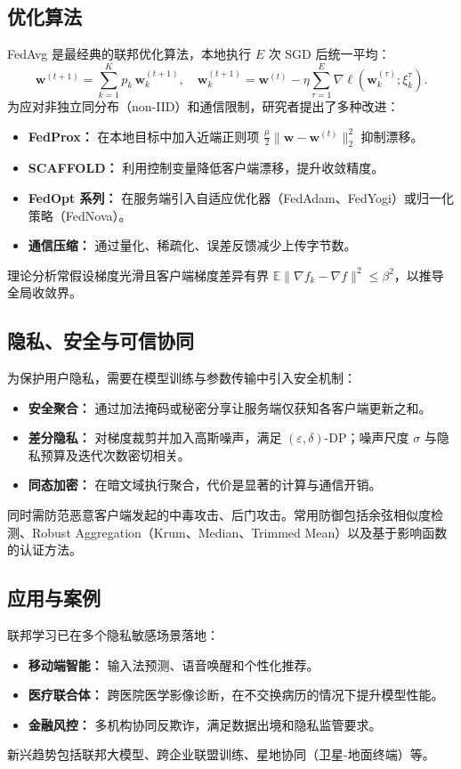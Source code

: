 \documentclass[UTF8,zihao=-4]{ctexart}
\begin{document}
\subsection{优化算法}
FedAvg 是最经典的联邦优化算法，本地执行 $E$ 次 SGD 后统一平均：
\begin{equation}
  \mathbf{w}^{(t+1)} = \sum_{k=1}^{K} p_k \, \mathbf{w}_k^{(t+1)}, \quad \mathbf{w}_k^{(t+1)} = \mathbf{w}^{(t)} - \eta \sum_{\tau=1}^{E} \nabla \ell(\mathbf{w}_k^{(\tau)}; \xi_k^\tau).
\end{equation}
为应对非独立同分布（non-IID）和通信限制，研究者提出了多种改进：
\begin{itemize}
  \item \textbf{FedProx：} 在本地目标中加入近端正则项 $\frac{\mu}{2}\|\mathbf{w}-\mathbf{w}^{(t)}\|_2^2$ 抑制漂移。
  \item \textbf{SCAFFOLD：} 利用控制变量降低客户端漂移，提升收敛精度。
  \item \textbf{FedOpt 系列：} 在服务端引入自适应优化器（FedAdam、FedYogi）或归一化策略（FedNova）。
  \item \textbf{通信压缩：} 通过量化、稀疏化、误差反馈减少上传字节数。
\end{itemize}
理论分析常假设梯度光滑且客户端梯度差异有界 $\mathbb{E}\|\nabla f_k - \nabla f\|^2 \le \beta^2$，以推导全局收敛界。

\subsection{隐私、安全与可信协同}
为保护用户隐私，需要在模型训练与参数传输中引入安全机制：
\begin{itemize}
  \item \textbf{安全聚合：} 通过加法掩码或秘密分享让服务端仅获知各客户端更新之和。
  \item \textbf{差分隐私：} 对梯度裁剪并加入高斯噪声，满足 $(\varepsilon,\delta)$-DP；噪声尺度 $\sigma$ 与隐私预算及迭代次数密切相关。
  \item \textbf{同态加密：} 在暗文域执行聚合，代价是显著的计算与通信开销。
\end{itemize}
同时需防范恶意客户端发起的中毒攻击、后门攻击。常用防御包括余弦相似度检测、Robust Aggregation（Krum、Median、Trimmed Mean）以及基于影响函数的认证方法。

\subsection{应用与案例}
联邦学习已在多个隐私敏感场景落地：
\begin{itemize}
  \item \textbf{移动端智能：} 输入法预测、语音唤醒和个性化推荐。
  \item \textbf{医疗联合体：} 跨医院医学影像诊断，在不交换病历的情况下提升模型性能。
  \item \textbf{金融风控：} 多机构协同反欺诈，满足数据出境和隐私监管要求。
\end{itemize}
新兴趋势包括联邦大模型、跨企业联盟训练、星地协同（卫星-地面终端）等。
\end{document}
